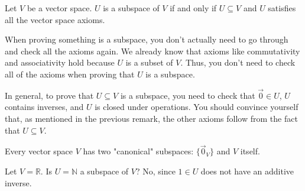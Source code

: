 \begin{definition}
    Let $V$ be a vector space. $U$ is a subspace of $V$ if and only if $U\subseteq V$ and $U$ satisfies all the vector space axioms.
\end{definition}
\begin{remark}
    When proving something is a subspace, you don't actually need to go through and check all the axioms again. We already know that axioms like commutativity and associativity hold because $U$ is a subset of $V$. Thus, you don't need to check all of the axioms when proving that $U$ is a subspace.
\end{remark}
In general, to prove that $U\subseteq V$ is a subspace, you need to check that $\vec{0}\in U$, $U$ contains inverses, and $U$ is closed under operations. You should convince yourself that, as mentioned in the previous remark, the other axioms follow from the fact that $U\subseteq V$.
\begin{remark}
    Every vector space $V$ has two "canonical" subspaces: $\{\vec{0}_V\}$ and $V$ itself.
\end{remark}
\begin{example}
    Let $V=\mathbb{R}$. Is $U=\mathbb{N}$ a subspace of $V$? No, since $1\in U$ does not have an additive inverse.
\end{example}
